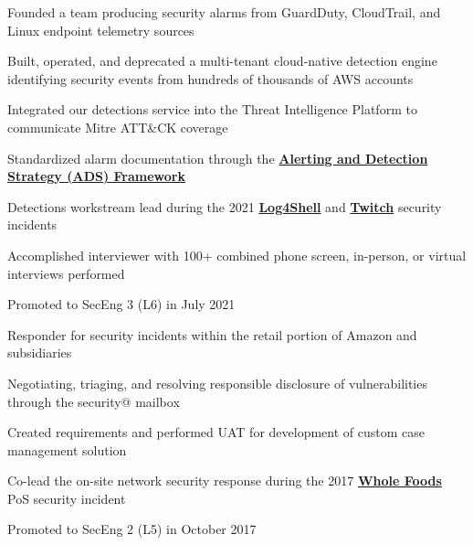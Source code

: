 \documentclass[letterpaper]{deedy-resume} %
\begin{document}
\begin{minipage}[t]{0.66\textwidth}
\begin{tightitemize}
\item Founded a team producing security alarms from GuardDuty, CloudTrail, and Linux endpoint telemetry sources
\item Built, operated, and deprecated a multi-tenant cloud-native detection engine identifying security events from hundreds of thousands of AWS accounts
\item Integrated our detections service into the Threat Intelligence Platform to communicate Mitre ATT\&CK coverage
\item Standardized alarm documentation through the \textbf{\href{https://blog.palantir.com/alerting-and-detection-strategy-framework-52dc33722df2}{Alerting and Detection Strategy (ADS) Framework}}
\item Detections workstream lead during the 2021 \textbf{\href{https://aws.amazon.com/blogs/opensource/hotpatch-for-apache-log4j/}{Log4Shell}} and \textbf{\href{https://blog.twitch.tv/en/2021/10/15/updates-on-the-twitch-security-incident/}{Twitch}} security incidents
\item Accomplished interviewer with 100+ combined phone screen, in-person, or virtual interviews performed
\item Promoted to SecEng 3 (L6) in July 2021
\end{tightitemize}

\sectionspace %



\begin{tightitemize}
\item Responder for security incidents within the retail portion of Amazon and subsidiaries
\item Negotiating, triaging, and resolving responsible disclosure of vulnerabilities through the security@ mailbox
\item Created requirements and performed UAT for development of custom case management solution
\item Co-lead the on-site network security response during the 2017 \textbf{\href{https://media.wholefoodsmarket.com/whole-foods-market-payment-card-investigation-update/}{Whole Foods}} PoS security incident
\item Promoted to SecEng 2 (L5) in October 2017
\end{tightitemize}


\end{minipage}
\end{document}
